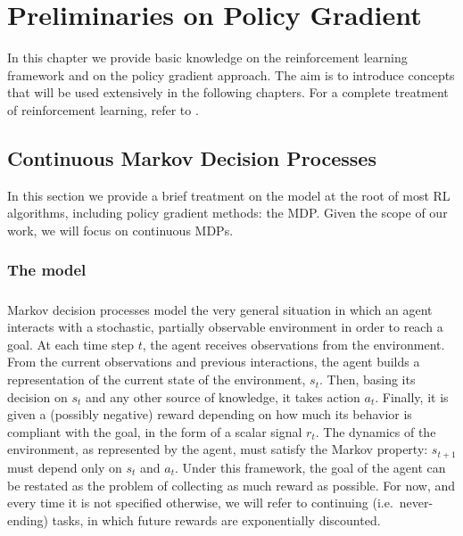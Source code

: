 \chapter{Preliminaries on Policy Gradient}
In this chapter we provide basic knowledge on the reinforcement learning framework and on the policy gradient approach. The aim is to introduce concepts that will be used extensively in the following chapters. For a complete treatment of reinforcement learning, refer to \cite{Sutton:1998:IRL:551283}.


\section{Continuous Markov Decision Processes}
In this section we provide a brief treatment on the model at the root of most \ac{RL} algorithms, including policy gradient methods: the \ac{MDP}.  
Given the scope of our work, we will focus on continuous \ac{MDP}s.

\subsection{The model}
\paragraph{} %
Markov decision processes model the very general situation in which an agent interacts with a stochastic, partially observable environment in order to reach a goal. At each time step $t$, the agent receives observations from the environment. From the current observations and previous interactions, the agent builds a representation of the current state of the environment, $s_t$. Then, basing its decision on $s_t$ and any other source of knowledge, it takes action $a_t$. Finally, it is given a (possibly negative) reward depending on how much its behavior is compliant with the goal, in the form of a scalar signal $r_t$. The dynamics of the environment, as represented by the agent, must satisfy the Markov property: $s_{t+1}$ must depend only on $s_t$ and $a_t$. Under this framework, the goal of the agent can be restated as the problem of collecting as much reward as possible. For now, and every time it is not specified otherwise, we will refer to continuing (i.e.\ never-ending) tasks, in which future rewards are exponentially discounted.

